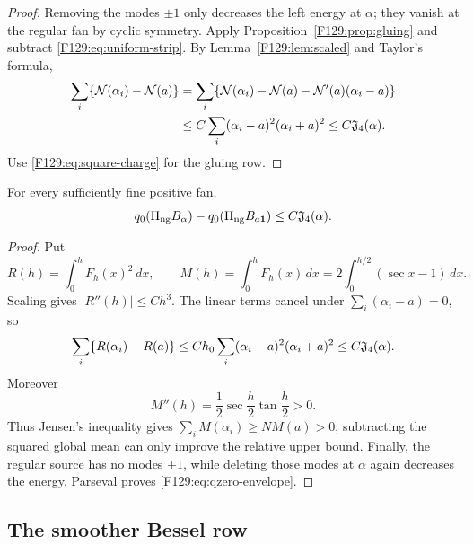 \begin{proof}
Removing the modes \(\pm1\) only decreases the left energy at \(\alpha\);
they vanish at the regular fan by cyclic symmetry.  Apply
Proposition~\ref{F129:prop:gluing} and subtract \eqref{F129:eq:uniform-strip}.
By Lemma~\ref{F129:lem:scaled} and Taylor's formula,
\begin{align}
 \sum_i\{\mathcal N(\alpha_i)-\mathcal N(a)\}
 &=\sum_i\{\mathcal N(\alpha_i)-\mathcal N(a)
           -\mathcal N'(a)(\alpha_i-a)\}\notag\\
 &\le C\sum_i(\alpha_i-a)^2(\alpha_i+a)^2
 \le C\mathfrak J_4(\alpha).\label{F129:eq:N-Bregman}
\end{align}
Use \eqref{F129:eq:square-charge} for the gluing row.
\end{proof}

\begin{lemma}\label{F129:lem:qzero}
For every sufficiently fine positive fan,
\begin{equation}\label{F129:eq:qzero-envelope}
 q_0(\Pi_{\rm ng} B_\alpha)-q_0(\Pi_{\rm ng} B_{a\mathbf1})
 \le C\mathfrak J_4(\alpha).
\end{equation}
\end{lemma}

\begin{proof}
Put
\begin{equation}
 R(h)=\int_0^hF_h(x)^2\,dx,\qquad
 M(h)=\int_0^hF_h(x)\,dx
     =2\int_0^{h/2}(\sec x-1)\,dx.
\end{equation}
Scaling gives \(|R''(h)|\le Ch^3\).  The linear terms cancel under
\(\sum_i(\alpha_i-a)=0\), so
\begin{equation}
 \sum_i\{R(\alpha_i)-R(a)\}
 \le C h_0\sum_i(\alpha_i-a)^2(\alpha_i+a)^2
 \le C\mathfrak J_4(\alpha).
\end{equation}
Moreover
\begin{equation}
 M''(h)=\frac12\sec\frac h2\tan\frac h2>0.
\end{equation}
Thus Jensen's inequality gives
\(\sum_iM(\alpha_i)\ge NM(a)>0\); subtracting the squared global mean can
only improve the relative upper bound.  Finally, the regular source has no
modes \(\pm1\), while deleting those modes at \(\alpha\) again decreases
the energy.  Parseval proves \eqref{F129:eq:qzero-envelope}.
\end{proof}

\subsection{The smoother Bessel row}

